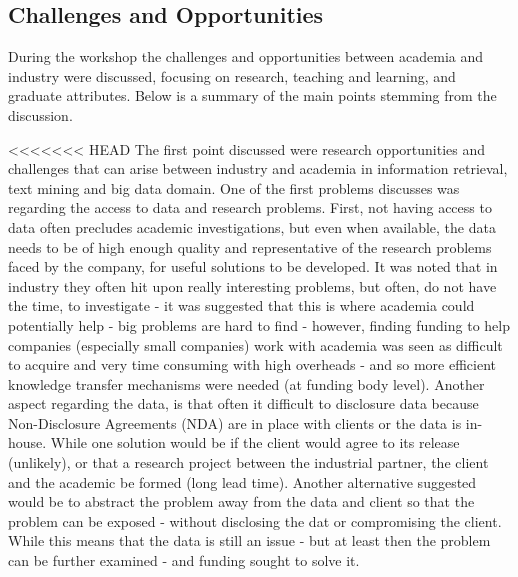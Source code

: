 
\subsection{Challenges and Opportunities}
During the workshop the challenges and opportunities between academia and industry were discussed, focusing on research, teaching and learning, and graduate attributes. Below is a summary of the main points stemming from the discussion.

<<<<<<< HEAD
The first point discussed were research opportunities and challenges that can arise between industry and academia in information retrieval, text mining and big data domain. One of the first problems discusses was regarding the access to data and research problems. First, not having access to data often precludes academic investigations,  but even when available, the data needs to be of high enough quality and representative of the research problems faced by the company, for useful solutions to be developed. It was noted that in industry they often hit upon really interesting problems, but often, do not have the time, to investigate - it was suggested that this is where academia could potentially help - big problems are hard to find - however, finding funding to help companies (especially small companies) work with academia was seen as difficult to acquire and very time consuming with high overheads - and so more efficient knowledge transfer mechanisms were needed (at funding body level). Another aspect regarding the data, is that often it difficult to disclosure data because Non-Disclosure Agreements (NDA) are in place with clients or the data is in-house. While one solution would be if the client would agree to its release (unlikely), or that a research project between the industrial partner, the client and the academic be formed (long lead time). Another alternative suggested would be to abstract the problem away from the data and client so that the problem can be exposed - without disclosing the dat or compromising the client. While this means that the data is still an issue - but at least then the problem can be further examined - and funding sought to solve it.


